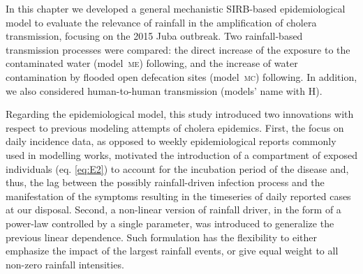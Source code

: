 In this chapter we developed a general mechanistic SIRB-based epidemiological model to evaluate the relevance of rainfall in the amplification of cholera transmission, focusing on the 2015 Juba outbreak. Two rainfall-based transmission processes were compared: the direct increase of the exposure to the contaminated water (model~\textsc{me}) following\cite{Eisenberg:ExaminingRainfallCholera:2013}, and the increase of water contamination by flooded open defecation sites (model~\textsc{mc}) following\cite{Rinaldo:Reassessment20102011:2012}. In addition, we also considered human-to-human transmission (models' name with \textsc{H}).

Regarding the epidemiological model, this study introduced two innovations with respect to previous modeling attempts of cholera epidemics\cite{Bertuzzo:ProbabilityExtinctionHaiti:2016,Pasetto:RealtimeProjectionsCholera:2017}. First, the focus on daily incidence data, as opposed to weekly epidemiological reports commonly used in modelling works, motivated the introduction of a compartment of exposed individuals (eq. \ref{eq:E2}) to account for the incubation period of the disease and, thus, the lag between the possibly rainfall-driven infection process and the manifestation of the symptoms resulting in the timeseries of daily reported cases at our disposal. %
Second, a non-linear version of rainfall driver, in the form of a power-law controlled by a single parameter, was introduced to generalize the previous linear dependence. Such formulation has the flexibility to either emphasize the impact of the largest rainfall events, or give equal weight to all non-zero rainfall intensities. %

